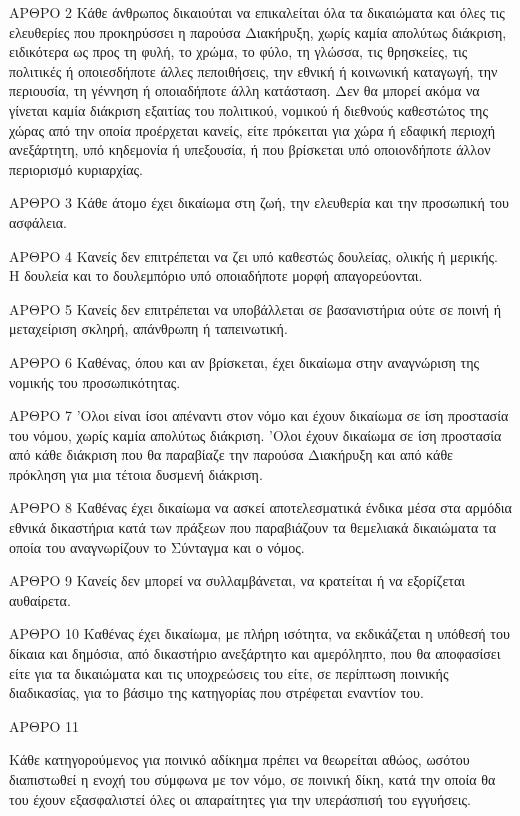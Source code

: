 \documentclass{report}
\begin{document}
      ΑΡΘΡΟ 2
      Κάθε άνθρωπος δικαιούται να επικαλείται όλα τα δικαιώματα και όλες τις ελευθερίες που προκηρύσσει η παρούσα Διακήρυξη, χωρίς καμία απολύτως διάκριση, ειδικότερα ως προς τη φυλή, το χρώμα, το φύλο, τη γλώσσα, τις θρησκείες, τις πολιτικές ή οποιεσδήποτε άλλες πεποιθήσεις, την εθνική ή κοινωνική καταγωγή, την περιουσία, τη γέννηση ή οποιαδήποτε άλλη κατάσταση.
      Δεν θα μπορεί ακόμα να γίνεται καμία διάκριση εξαιτίας του πολιτικού, νομικού ή διεθνούς καθεστώτος της χώρας από την οποία προέρχεται κανείς, είτε πρόκειται για χώρα ή εδαφική περιοχή ανεξάρτητη, υπό κηδεμονία ή υπεξουσία, ή που βρίσκεται υπό οποιονδήποτε άλλον περιορισμό κυριαρχίας.

      ΑΡΘΡΟ 3
      Κάθε άτομο έχει δικαίωμα στη ζωή, την ελευθερία και την προσωπική του ασφάλεια.

      ΑΡΘΡΟ 4
      Κανείς δεν επιτρέπεται να ζει υπό καθεστώς δουλείας, ολικής ή μερικής. Η δουλεία και το δουλεμπόριο υπό οποιαδήποτε μορφή απαγορεύονται.

      ΑΡΘΡΟ 5
      Κανείς δεν επιτρέπεται να υποβάλλεται σε βασανιστήρια ούτε σε ποινή ή μεταχείριση σκληρή, απάνθρωπη ή ταπεινωτική.

      ΑΡΘΡΟ 6
      Καθένας, όπου και αν βρίσκεται, έχει δικαίωμα στην αναγνώριση της νομικής του προσωπικότητας.

      ΑΡΘΡΟ 7
      'Ολοι είναι ίσοι απέναντι στον νόμο και έχουν δικαίωμα σε ίση προστασία του νόμου, χωρίς καμία απολύτως διάκριση. 'Ολοι έχουν δικαίωμα σε ίση προστασία από κάθε διάκριση που θα παραβίαζε την παρούσα Διακήρυξη και από κάθε πρόκληση για μια τέτοια δυσμενή διάκριση.

      ΑΡΘΡΟ 8
      Καθένας έχει δικαίωμα να ασκεί αποτελεσματικά ένδικα μέσα στα αρμόδια εθνικά δικαστήρια κατά των πράξεων που παραβιάζουν τα θεμελιακά δικαιώματα τα οποία του αναγνωρίζουν το Σύνταγμα και ο νόμος.

      ΑΡΘΡΟ 9
      Κανείς δεν μπορεί να συλλαμβάνεται, να κρατείται ή να εξορίζεται αυθαίρετα.

      ΑΡΘΡΟ 10
      Καθένας έχει δικαίωμα, με πλήρη ισότητα, να εκδικάζεται η υπόθεσή του δίκαια και δημόσια, από δικαστήριο ανεξάρτητο και αμερόληπτο, που θα αποφασίσει είτε για τα δικαιώματα και τις υποχρεώσεις του είτε, σε περίπτωση ποινικής διαδικασίας, για το βάσιμο της κατηγορίας που στρέφεται εναντίον του.

      ΑΡΘΡΟ 11


            Κάθε κατηγορούμενος για ποινικό αδίκημα πρέπει να θεωρείται αθώος, ωσότου διαπιστωθεί η ενοχή του σύμφωνα με τον νόμο, σε ποινική δίκη, κατά την οποία θα του έχουν εξασφαλιστεί όλες οι απαραίτητες για την υπεράσπισή του εγγυήσεις.
\end{document}
